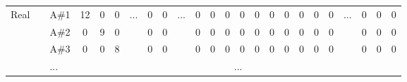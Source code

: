 \documentclass[12pt]{article}
\begin{document}
\begin{table}[!ht]
{\begin{tabular}{clcccccccccccccccccccccc}
			\multirow{22}{*}{Real} & \multicolumn{1}{l|}{\multirow{22}{*}{}} & \multicolumn{1}{c|}{A\#1} & \multicolumn{1}{c|}{12}   & \multicolumn{1}{c|}{0}    & \multicolumn{1}{c|}{0}    & \multicolumn{1}{c|}{\multirow{3}{*}{...}} & \multicolumn{1}{c|}{0}    & \multicolumn{1}{c|}{0}  & \multicolumn{1}{c|}{\multirow{3}{*}{...}} & \multicolumn{1}{c|}{0}  & \multicolumn{1}{c|}{0}  & \multicolumn{1}{c|}{0}  & \multicolumn{1}{c|}{0}  & \multicolumn{1}{c|}{0}    & \multicolumn{1}{c|}{0}    & \multicolumn{1}{c|}{0}    & \multicolumn{1}{c|}{0}    & \multicolumn{1}{c|}{0}    & \multicolumn{1}{c|}{0}    & \multicolumn{1}{c|}{\multirow{3}{*}{...}} & \multicolumn{1}{c|}{0}  & \multicolumn{1}{c|}{0}  & \multicolumn{1}{c|}{0}  \\ \cline{3-6} \cline{8-9} \cline{11-20} \cline{22-24} 
								   & \multicolumn{1}{l|}{}                   & \multicolumn{1}{c|}{A\#2} & \multicolumn{1}{c|}{0}    & \multicolumn{1}{c|}{9}    & \multicolumn{1}{c|}{0}    & \multicolumn{1}{c|}{}                     & \multicolumn{1}{c|}{0}    & \multicolumn{1}{c|}{0}  & \multicolumn{1}{c|}{}                     & \multicolumn{1}{c|}{0}  & \multicolumn{1}{c|}{0}  & \multicolumn{1}{c|}{0}  & \multicolumn{1}{c|}{0}  & \multicolumn{1}{c|}{0}    & \multicolumn{1}{c|}{0}    & \multicolumn{1}{c|}{0}    & \multicolumn{1}{c|}{0}    & \multicolumn{1}{c|}{0}    & \multicolumn{1}{c|}{0}    & \multicolumn{1}{c|}{}                     & \multicolumn{1}{c|}{0}  & \multicolumn{1}{c|}{0}  & \multicolumn{1}{c|}{0}  \\ \cline{3-6} \cline{8-9} \cline{11-20} \cline{22-24} 
								   & \multicolumn{1}{l|}{}                   & \multicolumn{1}{c|}{A\#3} & \multicolumn{1}{c|}{0}    & \multicolumn{1}{c|}{0}    & \multicolumn{1}{c|}{8}    & \multicolumn{1}{c|}{}                     & \multicolumn{1}{c|}{0}    & \multicolumn{1}{c|}{0}  & \multicolumn{1}{c|}{}                     & \multicolumn{1}{c|}{0}  & \multicolumn{1}{c|}{0}  & \multicolumn{1}{c|}{0}  & \multicolumn{1}{c|}{0}  & \multicolumn{1}{c|}{0}    & \multicolumn{1}{c|}{0}    & \multicolumn{1}{c|}{0}    & \multicolumn{1}{c|}{0}    & \multicolumn{1}{c|}{0}    & \multicolumn{1}{c|}{0}    & \multicolumn{1}{c|}{}                     & \multicolumn{1}{c|}{0}  & \multicolumn{1}{c|}{0}  & \multicolumn{1}{c|}{0}  \\ \cline{3-6} \cline{8-9} \cline{11-20} \cline{22-24} 
								   & \multicolumn{1}{l|}{}                   & \multicolumn{1}{l|}{...}  & \multicolumn{21}{c|}{...}                                                                                                                                                                                                                                                                                                                                                                                                                                                                                                                                                                                                                 \\ \cline{3-6} \cline{8-9} \cline{11-20} \cline{22-24} 

\end{tabular}}
\end{table}
\end{document}
